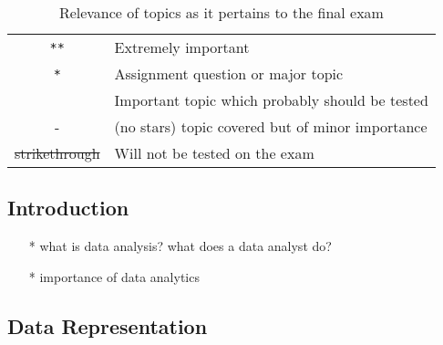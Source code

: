 \documentclass[12pt]{article}%
\begin{document}
\begin{table}[h]
\caption{Relevance of topics as it pertains to the final exam}
\begin{center}
\begin{tabular}{|c|l|}
\hline
{\tt ***} & Extremely important\\
 {\tt **} & Assignment question or major topic\\
  {\tt *} &Important topic which probably should be tested\\
    -& (no stars) topic covered but of minor importance\\
   \st{strikethrough} & Will not be tested on the exam\\ 
\hline
\end{tabular}
\end{center}
\label{default}
\end{table}%







\subsection*{Introduction}

\begin{itemize}[noitemsep]
 \setlength{\itemsep}{1pt}%
    \setlength{\parskip}{1pt}
\item[*]  what is data analysis? what does a data analyst do?
\item[*]   importance of data analytics
\end{itemize}


\subsection*{Data Representation}
\end{document}
